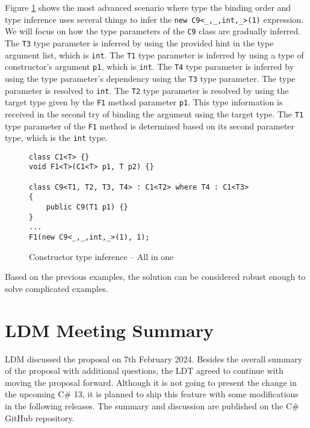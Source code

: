 \par
Figure \ref{img79:example7} shows the most advanced scenario where type the binding order and type inference uses several things to infer the \texttt{new C9<\_,\_,int,\_>(1)} expression. 
We will focus on how the type parameters of the \texttt{C9} class are gradually inferred. 
The \texttt{T3} type parameter is inferred by using the provided hint in the type argument list, which is \texttt{int}. 
The \texttt{T1} type parameter is inferred by using a type of constructor’s argument \texttt{p1}, which is \texttt{int}.
The \texttt{T4} type parameter is inferred by using the type parameter’s dependency using the \texttt{T3} type parameter. 
The type parameter is resolved to \texttt{int}. 
The \texttt{T2} type parameter is resolved by using the target type given by the \texttt{F1} method parameter \texttt{p1}. 
This type information is received in the second try of binding the argument using the target type. 
The \texttt{T1} type parameter of the \texttt{F1} method is determined based on its second parameter type, which is the \texttt{int} type.
\begin{figure}[h]
\begin{lstlisting}[style=csharp, showstringspaces=false]
class C1<T> {}
void F1<T>(C1<T> p1, T p2) {}

class C9<T1, T2, T3, T4> : C1<T2> where T4 : C1<T3>
{
    public C9(T1 p1) {}
}
...
F1(new C9<_,_,int,_>(1), 1);
\end{lstlisting}
\caption{Constructor type inference -- All in one}
\label{img79:example7}
\end{figure}
\par
Based on the previous examples, the solution can be considered robust enough to solve complicated examples.

\newpage

\section{LDM Meeting Summary}

\ac{LDM} discussed the proposal on 7th February 2024. 
Besides the overall summary of the proposal with additional questions, the \ac{LDT} agreed to continue with moving the proposal forward. 
Although it is not going to present the change in the upcoming C\# 13, it is planned to ship this feature with some modifications in the following releases. 
The summary \cite{online:mettingSummary} and discussion \cite{online:mettingSummaryDisc} are published on the C\# GitHub repository.